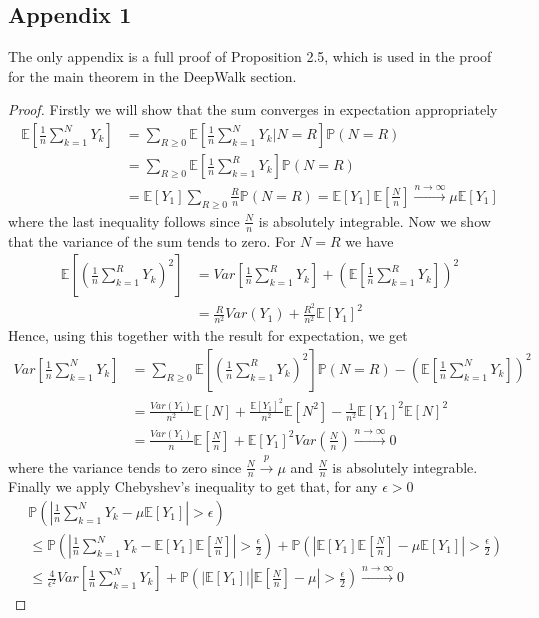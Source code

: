 \documentclass[a4paper]{article}
\renewcommand{\P}{\mathbb P}
\renewcommand{\E}{\mathbb E}
\begin{document}
\subsection{Appendix 1}
The only appendix is a full proof of Proposition 2.5, which is used in the proof for the main theorem in the DeepWalk section.
\Prop*
\begin{proof}
Firstly we will show that the sum converges in expectation appropriately
\begin{align*}
\E\left[\frac{1}{n}\sum_{k=1}^N Y_k\right] &= \sum_{R \geq 0} \E\left[\frac{1}{n}\sum_{k=1}^N Y_k | N = R\right]\P(N = R)\\
&= \sum_{R \geq 0} \E\left[\frac{1}{n}\sum_{k=1}^R Y_k \right]\P(N = R)\\
&= \E[Y_1]\sum_{R \geq 0} \frac{R}{n}\P(N = R) = \E[Y_1]\E\left[\frac{N}{n}\right] \overset{n \to \infty}{\longrightarrow} \mu\E[Y_1]
\end{align*}
where the last inequality follows since $\frac{N}{n}$ is absolutely integrable. Now we show that the variance of the sum tends to zero. For $N = R$ we have
\begin{align*}
\E\left[\left(\frac{1}{n}\sum_{k=1}^R Y_k\right)^2\right] &= Var\left[\frac{1}{n}\sum_{k=1}^R Y_k\right] + \left(\E\left[\frac{1}{n}\sum_{k=1}^R Y_k\right]\right)^2\\
&=\frac{R}{n^2}Var(Y_1) + \frac{R^2}{n^2}\E[Y_1]^2
\end{align*}
Hence, using this together with the result for expectation, we get
\begin{align*}
  Var\left[\frac{1}{n}\sum_{k=1}^N Y_k\right] &= \sum_{R \geq 0}\E\left[\left(\frac{1}{n}\sum_{k=1}^R Y_k\right)^2 \right]\P(N = R) - \left(\E\left[\frac{1}{n}\sum_{k=1}^N Y_k\right]\right)^2\\
  &=\frac{Var(Y_1)}{n^2}\E[N] + \frac{\E[Y_1]^2}{n^2}\E[N^2] - \frac{1}{n^2}\E[Y_1]^2\E[N]^2\\
  &= \frac{Var(Y_1)}{n}\E\left[\frac{N}{n}\right] + \E[Y_1]^2Var\left(\frac{N}{n}\right) \overset{n \to \infty}{\longrightarrow} 0
\end{align*}
where the variance tends to zero since $\frac{N}{n} \overset{p}{\longrightarrow} \mu$ and $\frac{N}{n}$ is absolutely integrable. Finally we apply Chebyshev's inequality to get that, for any $\epsilon > 0$
\begin{align*}
&\P\left(\left|\frac{1}{n}\sum_{k=1}^N Y_k - \mu\E[Y_1]\right| > \epsilon\right)\\
&\leq \P\left(\left|\frac{1}{n}\sum_{k=1}^N Y_k - \E[Y_1]\E\left[\frac{N}{n}\right]\right| > \frac{\epsilon}{2}\right) + \P\left(\left|\E[Y_1]\E\left[\frac{N}{n}\right] - \mu\E[Y_1]\right| > \frac{\epsilon}{2}\right)\\
&\leq \frac{4}{\epsilon^2}Var\left[\frac{1}{n}\sum_{k=1}^N Y_k\right] + \P\left(|\E[Y_1]|\left|\E\left[\frac{N}{n}\right] - \mu\right| > \frac{\epsilon}{2}\right) \overset{n \to \infty}{\longrightarrow} 0
\end{align*}
\end{proof}
\end{document}
